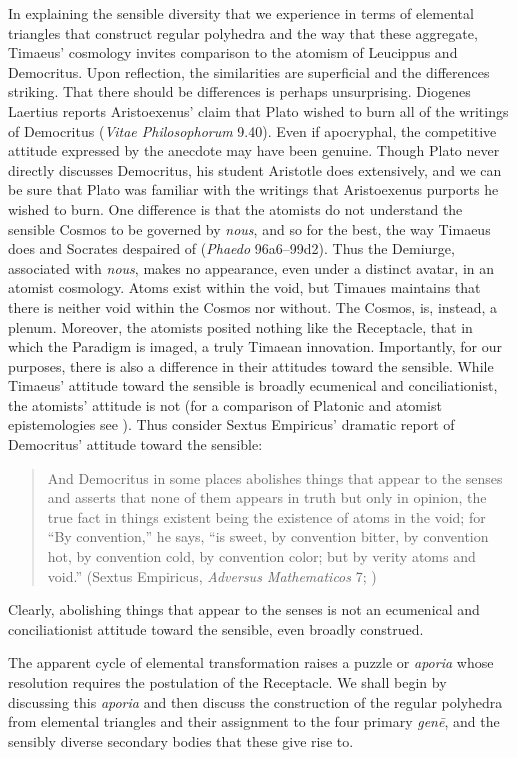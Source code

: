 In explaining the sensible diversity that we experience in terms of elemental triangles that construct regular polyhedra and the way that these aggregate, Timaeus' cosmology invites comparison to the atomism of Leucippus and Democritus. Upon reflection, the similarities are superficial and the differences striking. That there should be differences is perhaps unsurprising. Diogenes Laertius reports Aristoexenus' claim that Plato wished to burn all of the writings of Democritus (\emph{Vitae Philosophorum} 9.40). Even if apocryphal, the competitive attitude expressed by the anecdote may have been genuine. Though Plato never directly discusses Democritus, his student Aristotle does extensively, and we can be sure that Plato was familiar with the writings that Aristoexenus purports he wished to burn. One difference is that the atomists do not understand the sensible Cosmos to be governed by \emph{nous}, and so for the best, the way Timaeus does and Socrates despaired of (\emph{Phaedo} 96a6–99d2). Thus the Demiurge, associated with \emph{nous}, makes no appearance, even under a distinct avatar, in an atomist cosmology. Atoms exist within the void, but Timaues maintains that there is neither void within the Cosmos nor without. The Cosmos, is, instead, a plenum. Moreover, the atomists posited nothing like the Receptacle, that in which the Paradigm is imaged, a truly Timaean innovation. Importantly, for our purposes, there is also a difference in their attitudes toward the sensible. While Timaeus' attitude toward the sensible is broadly ecumenical and conciliationist, the atomists' attitude is not (for a comparison of Platonic and atomist epistemologies see \citealt{Lee:2005qr}). Thus consider Sextus Empiricus' dramatic report of Democritus' attitude toward the sensible:
\begin{quote}
	And Democritus in some places abolishes things that appear to the senses and asserts that none of them appears in truth but only in opinion, the true fact in things existent being the existence of atoms in the void; for ``By convention,'' he says, ``is sweet, by convention bitter, by convention hot, by convention cold, by convention color; but by verity atoms and void.'' (Sextus Empiricus, \emph{Adversus Mathematicos} 7; \citealt{Bury:1997uq})
\end{quote}
Clearly, abolishing things that appear to the senses is not an ecumenical and conciliationist attitude toward the sensible, even broadly construed.

The apparent cycle of elemental transformation raises a puzzle or \emph{aporia} whose resolution requires the postulation of the Receptacle. We shall begin by discussing this \emph{aporia} and then discuss the construction of the regular polyhedra from elemental triangles and their assignment to the four primary \emph{genē}, and the sensibly diverse secondary bodies that these give rise to. 

